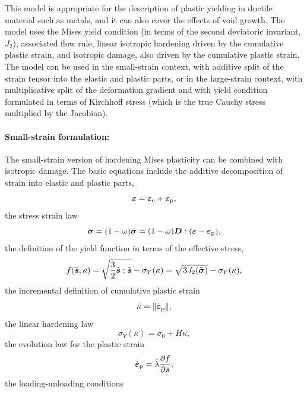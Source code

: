 \documentclass[a4paper]{article}
\newcommand{\mbf}[1]{\mbox{\boldmath$#1$}}
\newcommand{\eps} {\mbf{\varepsilon}}
\newcommand{\epspd} {\dot{\eps}_{\mathrm{p}}}
\newcommand{\veps}{\mbf{\varepsilon}}  %
\newcommand{\vsig}{\mbf{\sigma}}%
\newcommand{\vs}{\mbf{s}}%
\begin{document}
This model is appropriate for the description of plastic yielding in ductile material such as metals, and it can also cover the effects of void growth.
The model uses the Mises yield condition (in terms of the second deviatoric invariant, $J_2$),
associated flow rule, linear isotropic hardening driven by the cumulative plastic strain,
and isotropic damage, also driven by the cumulative plastic strain. The model can be used in the small-strain context, with additive split 
of the strain tensor into the elastic and plastic parts, or in the large-strain context,
with multiplicative split of the deformation gradient and with yield condition formulated in terms of Kirchhoff stress (which is the true Cauchy stress multiplied by the Jacobian).

\paragraph{Small-strain formulation:}
The small-strain version of hardening Mises plasticity can be combined with isotropic damage.
The basic equations include the additive decomposition of strain into elastic and plastic parts,
\begin{equation}\label{VMadditiveDecomposition}
\veps = \veps_{\rm{e}} + \veps_{\rm{p}},
\end{equation}
the stress strain law 
\begin{equation}\label{VMconstitutiveEquation}
\vsig = (1-\omega)\bar{\vsig}=(1-\omega)\mbf{D} :(\veps-\veps_{\rm{p}}),
\end{equation}
the definition of the yield function in terms of the effective stress,
\begin{equation}\label{VMvonMisesCondition}
f(\bar{\vs},\kappa) = \sqrt{\frac{3}{2}\bar{\vs}:\bar{\vs}}-\sigma_Y(\kappa) = \sqrt{3 J_2(\bar{\vsig})}-\sigma_Y(\kappa),
\end{equation}
the incremental definition of cumulative plastic strain
\begin{equation}\label{VMcumPlasStrain}
\dot{\kappa} = \| \epspd \|,
\end{equation}
the linear hardening law
\begin{equation}\label{VMlinearHardeningLaw}
\sigma_Y(\kappa) = \sigma_0 + H\kappa,
\end{equation}
the evolution law for the plastic strain
\begin{equation}
 \epspd = \dot{\lambda}\frac{\partial f}{\partial \bar{\vs}},
\end{equation}
the loading-unloading conditions
\end{document}
